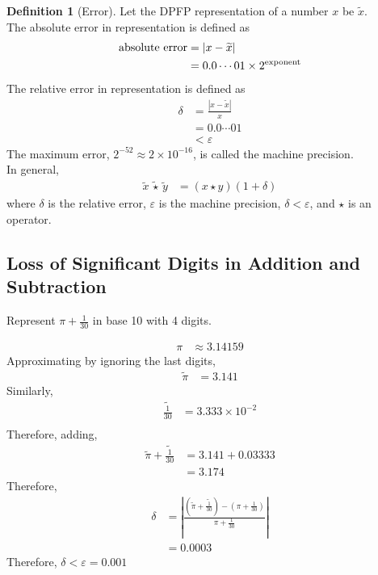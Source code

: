 \documentclass[fleqn, a4paper, 12pt, twoside]{article}
\theoremstyle{definition}
\newtheorem{definition}{Definition}
\theoremstyle{theorem}
\renewcommand{\tilde}{\widetilde}
\begin{document}
\begin{definition}[Error]
	Let the DPFP representation of a number $x$ be $\tilde{x}$.\\
	The absolute error in representation is defined as
	\begin{align*}
		\textnormal{absolute error} & = \left| x - \tilde{x} \right| \\
                                            & = 0.0 \cdots 01 \times 2^{\text{exponent}}
	\end{align*}
	The relative error in representation is defined as
	\begin{align*}
		\delta & = \frac{\left| x - \tilde{x} \right|}{x} \\
                       & = 0.0 \cdots 01                          \\
                       & < \varepsilon
	\end{align*}
	The maximum error, $2^{-52} \approx 2 \times 10^{-16}$, is called the machine precision.\\
	In general,
	\begin{align*}
		\tilde{x} \, \tilde{\star} \, \tilde{y} & = \left( x \star y \right) \left( 1 + \delta \right)
	\end{align*}
	where $\delta$ is the relative error, $\varepsilon$ is the machine precision, $\delta < \varepsilon$, and $\star$ is an operator. 
\end{definition}

\subsection{Loss of Significant Digits in Addition and Subtraction}

\begin{question}
	Represent $\pi + \frac{1}{30}$ in base 10 with 4 digits.
\end{question}

\begin{solution}
	\begin{align*}
		\pi & \approx 3.14159
	\end{align*}
	Approximating by ignoring the last digits,
	\begin{align*}
		\tilde{\pi} & = 3.141
	\end{align*}
	Similarly,
	\begin{align*}
		\tilde{\frac{1}{30}} & = 3.333 \times 10^{-2} \\
	\end{align*}
	Therefore, adding,
	\begin{align*}
		\tilde{\pi} + \tilde{\frac{1}{30}} & = 3.141 + 0.03333 \\
                                                   & = 3.174
	\end{align*}
	Therefore,
	\begin{align*}
		\delta & = \left| \frac{\left( \tilde{\pi} + \tilde{\frac{1}{30}} \right) - \left( \pi + \frac{1}{30} \right)}{\pi + \frac{1}{30}} \right| \\
                       & = 0.0003
	\end{align*}
	Therefore, $\delta < \varepsilon = 0.001$
\end{solution}
\end{document}
